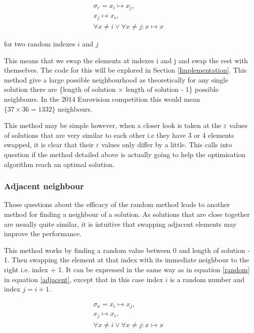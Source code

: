 \documentclass[12pt]{report}
\begin{document}
\begin{equation}\label{random}
\begin{split}
	\sigma_r = x_i \mapsto x_j,\\ x_j \mapsto x_i,\\ \forall x \neq i \lor \forall x \neq j: x \mapsto x
\end{split}
\end{equation}

for two random indexes $i$ and $j$

This means that we swap the elements at indexes i and j and swap the rest with themselves. The code for this will be explored in Section \ref{Implementation}. This method give a large possible neighbourhood as theoretically for any single solution there are \{length of solution $\times$ length of solution - 1\} possible neighbours. In the 2014 Eurovision competition this would mean $\{37 \times 36 = 1332\}$ neighbours.

This method may be simple however, when a closer look is taken at the $\varepsilon$ values of solutions that are very similar to each other i.e they have 3 or 4 elements swapped, it is clear that their $\varepsilon$ values only differ by a little. This calls into question if the method detailed above is actually going to help the optimisation algorithm reach an optimal solution.

\subsubsection{Adjacent neighbour}
Those questions about the efficacy of the random method leads to another method for finding a neighbour of a solution. As solutions that are close together are usually quite similar, it is intuitive that swapping adjacent elements may improve the performance.

This method works by finding a random value between 0 and length of solution - 1. Then swapping the element at that index with its immediate neighbour to the right i.e. index + 1. It can be expressed in the same way as in equation \ref{random} in equation \ref{adjacent}, except that in this case index $i$ is a random number and index $j = i + 1$.

\begin{equation}\label{adjacent}
\begin{split}
	\sigma_a = x_i \mapsto x_j,\\ x_j \mapsto x_i,\\ \forall x \neq i \lor \forall x \neq j: x \mapsto x
\end{split}
\end{equation}
\end{document}
